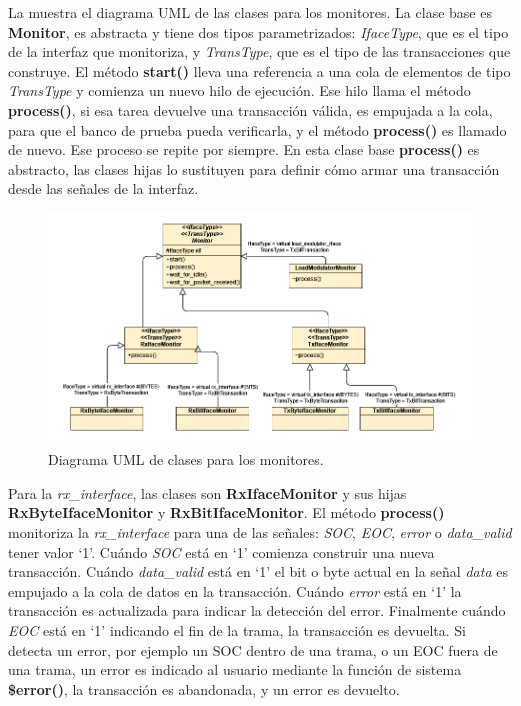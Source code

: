 \documentclass[a4paper, twoside, 11pt]{report}
\begin{document}
La  muestra el diagrama UML de las clases para los monitores. La clase base es \textbf{Monitor}, es abstracta y tiene dos tipos parametrizados: \textit{IfaceType}, que es el tipo de la interfaz que monitoriza, y \textit{TransType}, que es el tipo de las transacciones que construye. El método \textbf{start()} lleva una referencia a una cola de elementos de tipo \textit{TransType} y comienza un nuevo hilo de ejecución. Ese hilo llama el método \textbf{process()}, si esa tarea devuelve una transacción válida, es empujada a la cola, para que el banco de prueba pueda verificarla, y el método \textbf{process()} es llamado de nuevo. Ese proceso se repite por siempre. En esta clase base \textbf{process()} es abstracto, las clases hijas lo sustituyen para definir cómo armar una transacción desde las señales de la interfaz.

\vfill

\begin{figure}[htb]
  \centering
  \includegraphics[width=1.0\textwidth]{./img/monitors_uml.vpd}
  \caption{Diagrama UML de clases para los monitores.}
  \label{fig:monitor_uml}
\end{figure}

Para la \textit{rx\_interface}, las clases son \textbf{RxIfaceMonitor} y sus hijas \textbf{RxByteIfaceMonitor} y \textbf{RxBitIfaceMonitor}. El método \textbf{process()} monitoriza la \textit{rx\_interface} para una de las señales: \textit{SOC}, \textit{EOC}, \textit{error} o \textit{data\_valid} tener valor ‘1’. Cuándo \textit{SOC} está en ‘1’ comienza construir una nueva transacción. Cuándo \textit{data\_valid} está en ‘1’ el bit o byte actual en la señal \textit{data} es empujado a la cola de datos en la transacción. Cuándo \textit{error} está en ‘1’ la transacción es actualizada para indicar la detección del error. Finalmente cuándo \textit{EOC} está en ‘1’ indicando el fin de la trama, la transacción es devuelta. Si detecta un error, por ejemplo un SOC dentro de una trama, o un EOC fuera de una trama, un error es indicado al usuario mediante la función de sistema \textbf{\$error()}, la transacción es abandonada, y un error es devuelto.
\end{document}
